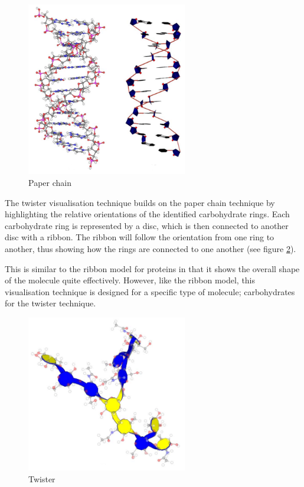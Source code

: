 \begin{figure}[h!]
  \begin{center}
    \includegraphics[width=70mm]{paper_chain}
  \end{center}
  \caption{Paper chain}
  \label{fig:paperchain}
\end{figure}

The twister visualisation technique \citep{kuttel06} builds on the paper
chain technique by highlighting the relative orientations of the identified
carbohydrate rings. Each carbohydrate ring is represented by a disc, which is
then connected to another disc with a ribbon. The ribbon will follow the
orientation from one ring to another, thus showing how the rings are connected
to one another (see figure \ref{fig:twister}).

This is similar to the ribbon model for proteins in that it shows the overall
shape of the molecule quite effectively. However, like the ribbon model, this
visualisation technique is designed for a specific type of molecule;
carbohydrates for the twister technique.

\begin{figure}[h!]
  \begin{center}
    \includegraphics[width=70mm]{twister}
  \end{center}
  \caption{Twister}
  \label{fig:twister}
\end{figure}

